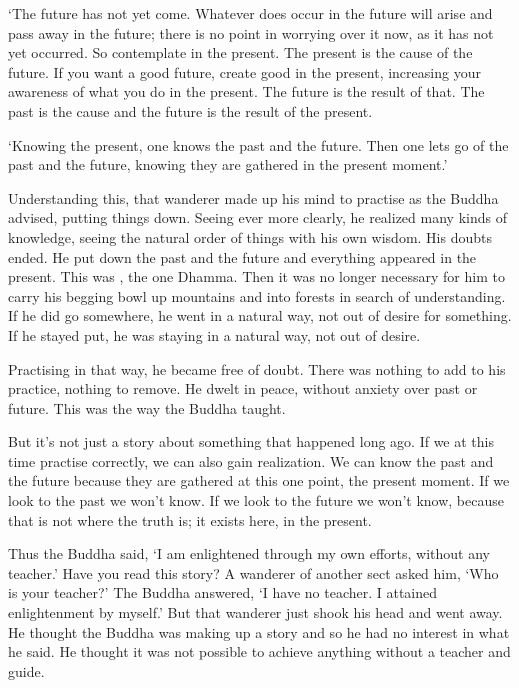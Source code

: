 `The future has not yet come. Whatever does occur in the future will arise and pass away in the future; there is no point in worrying over it now, as it has not yet occurred. So contemplate in the present. The present is the cause of the future. If you want a good future, create good in the present, increasing your awareness of what you do in the present. The future is the result of that. The past is the cause and the future is the result of the present.

`Knowing the present, one knows the past and the future. Then one lets go of the past and the future, knowing they are gathered in the present moment.'

Understanding this, that wanderer made up his mind to practise as the Buddha advised, putting things down. Seeing ever more clearly, he realized many kinds of knowledge, seeing the natural order of things with his own wisdom. His doubts ended. He put down the past and the future and everything appeared in the present. This was , the one Dhamma. Then it was no longer necessary for him to carry his begging bowl up mountains and into forests in search of understanding. If he did go somewhere, he went in a natural way, not out of desire for something. If he stayed put, he was staying in a natural way, not out of desire.

Practising in that way, he became free of doubt. There was nothing to add to his practice, nothing to remove. He dwelt in peace, without anxiety over past or future. This was the way the Buddha taught.

But it's not just a story about something that happened long ago. If we at this time practise correctly, we can also gain realization. We can know the past and the future because they are gathered at this one point, the present moment. If we look to the past we won't know. If we look to the future we won't know, because that is not where the truth is; it exists here, in the present.

Thus the Buddha said, `I am enlightened through my own efforts, without any teacher.' Have you read this story? A wanderer of another sect asked him, `Who is your teacher?' The Buddha answered, `I have no teacher. I attained enlightenment by myself.' But that wanderer just shook his head and went away. He thought the Buddha was making up a story and so he had no interest in what he said. He thought it was not possible to achieve anything without a teacher and guide.


